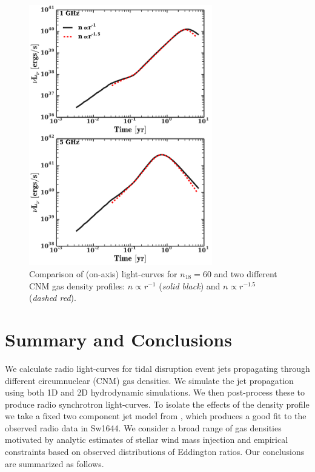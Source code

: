 \documentclass[usenatbib,fleqn]{mnras}
\begin{document}
\begin{figure} 
  \includegraphics[width=8cm]{profs2.pdf}
  \caption{\label{fig:profs2} Comparison of (on-axis) light-curves for
    $n_{18}=60$ and two different CNM gas density profiles: $n\propto
    r^{-1}$ ({\it solid black}) and $n\propto r^{-1.5}$ ({\it dashed
      red}).}
\end{figure}



\section{Summary and Conclusions}
\label{sec:conc}

We calculate radio light-curves for tidal disruption event jets
propagating through different circumnuclear (CNM) gas densities. We
simulate the jet propagation using both 1D and 2D hydrodynamic
simulations. We then post-process these to produce radio synchrotron
light-curves. To isolate the effects of the density profile we take a
fixed two component jet model from \citet{Mimica+2015}, which produces
a good fit to the observed radio data in Sw1644. We
consider a broad range of gas densities motivated by analytic
estimates of stellar wind mass injection and empirical constraints
based on observed distributions of Eddington ratios. Our conclusions
are summarized as follows.
\end{document}
